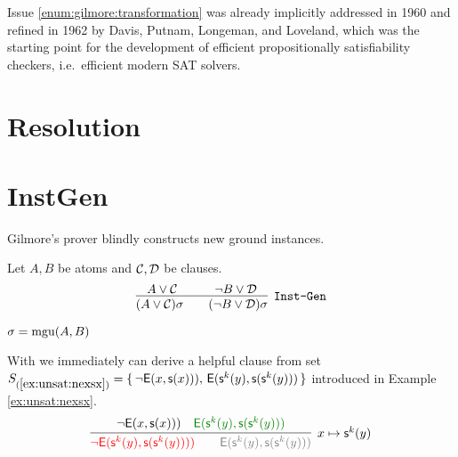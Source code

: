 Issue \ref{enum:gilmore:transformation} was already implicitly 
addressed in 1960 \cite{Davis:1960:CPQ:321033.321034}
and refined in 1962 \cite{Davis:1962:MPT:368273.368557}
by Davis, Putnam, Longeman, and Loveland, 
which was the starting point for the development of efficient propositionally satisfiability checkers, i.e.~efficient modern SAT solvers.

\section{Resolution}

\section{InstGen}

Gilmore's prover blindly constructs new ground instances. 

\begin{definition}[\InstGen] Let $A, B$ be atoms and ${\mathcal C},{\mathcal D}$ be clauses.
	\begin{gather*}
	\infer
	[{\InstGen}] 
	{(A\lor\mathcal C)\sigma\qquad (\lnot B\lor\mathcal D)\sigma}
	{A\lor\mathcal C\quad&\quad \lnot B\lor\mathcal D}
	\end{gather*}
	\begin{center}$\sigma=\operatorname{mgu}(A,B)$
	\end{center}
\end{definition}

\begin{example}
	With \InstGen we immediately can derive a helpful clause from set
$S_{(\ref{ex:unsat:nexsx})} =
\{\,
{ \lnot{\mathsf{E}}(x, {\mathsf s}(x)))},\, 
{ {\mathsf{E}}({\mathsf s}^k(y), {\mathsf s}({\mathsf s}^k(y)))}
\,\}$ 
 introduced in Example \ref{ex:unsat:nexsx}. 
\begin{gather*}
\infer[x\mapsto\msucc^k(y)]{
	{\colLo \lnot\mE(\ms^k(y), \ms(\ms^k(y))))} \qquad
	{\colG \mE(\ms^k(y), \ms(\ms^k(y)))}
}{
	{ \lnot\mE(x, \ms(x)))} &
	{\colHi \mE(\ms^k(y), \ms(\ms^k(y)))}
}
\end{gather*}
	
\end{example}

